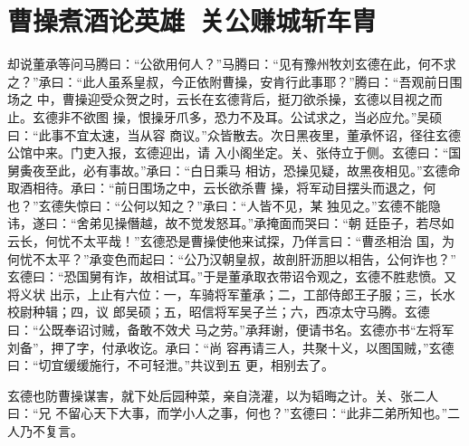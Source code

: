 \chapter{曹操煮酒论英雄~关公赚城斩车胄}

却说董承等问马腾曰：“公欲用何人？”马腾曰：“见有豫州牧刘玄德在此，何不求
之？”承曰：“此人虽系皇叔，今正依附曹操，安肯行此事耶？”腾曰：“吾观前日围场之
中，曹操迎受众贺之时，云长在玄德背后，挺刀欲杀操，玄德以目视之而止。玄德非不欲图
操，恨操牙爪多，恐力不及耳。公试求之，当必应允。”吴硕曰：“此事不宜太速，当从容
商议。”众皆散去。次日黑夜里，董承怀诏，径往玄德公馆中来。门吏入报，玄德迎出，请
入小阁坐定。关、张侍立于侧。玄德曰：“国舅夤夜至此，必有事故。”承曰：“白日乘马
相访，恐操见疑，故黑夜相见。”玄德命取酒相待。承曰：“前日围场之中，云长欲杀曹
操，将军动目摆头而退之，何也？”玄德失惊曰：“公何以知之？”承曰：“人皆不见，某
独见之。”玄德不能隐讳，遂曰：“舍弟见操僭越，故不觉发怒耳。”承掩面而哭曰：“朝
廷臣子，若尽如云长，何忧不太平哉！”玄德恐是曹操使他来试探，乃佯言曰：“曹丞相治
国，为何忧不太平？”承变色而起曰：“公乃汉朝皇叔，故剖肝沥胆以相告，公何诈也？”
玄德曰：“恐国舅有诈，故相试耳。”于是董承取衣带诏令观之，玄德不胜悲愤。又将义状
出示，上止有六位：一，车骑将军董承；二，工部侍郎王子服；三，长水校尉种辑；四，议
郎吴硕；五，昭信将军吴子兰；六，西凉太守马腾。玄德曰：“公既奉诏讨贼，备敢不效犬
马之劳。”承拜谢，便请书名。玄德亦书“左将军刘备”，押了字，付承收讫。承曰：“尚
容再请三人，共聚十义，以图国贼，”玄德曰：“切宜缓缓施行，不可轻泄。”共议到五
更，相别去了。

玄德也防曹操谋害，就下处后园种菜，亲自浇灌，以为韬晦之计。关、张二人曰：“兄
不留心天下大事，而学小人之事，何也？”玄德曰：“此非二弟所知也。”二人乃不复言。

